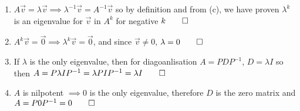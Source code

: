 \documentclass[12pt, a4paper]{article}
\begin{document}
\begin{enumerate}[Q\arabic*.]
\begin{enumerate}[(\alph*)]
      \item $A \vec{v} = \lambda \vec{v} \implies \lambda^{-1} \vec{v} = A^{-1} \vec{v}$ so by definition and from (c), we have proven $\lambda^k$ is an eigenvalue for $\vec{v}$ in $A^k$ for negative $k \qed$ 

      \item $A^k \vec{v} = \vec{0} \implies \lambda^k \vec{v} = \vec{0}$, and since $\vec{v} \neq 0$, $\lambda = 0 \qed$

      \item If $\lambda$ is the only eigenvalue, then for diagoanlisation $A=PDP^{-1}$, $D=\lambda I$ so then $A = P\lambda I P^{-1} = \lambda PIP^{-1} = \lambda I \qed$

      \item $A$ is nilpotent $\implies 0$ is the only eigenvalue, therefore $D$ is the zero matrix and $A = P 0 P^{-1} = 0 \qed$
    \end{enumerate}
\end{enumerate}
\end{document}
